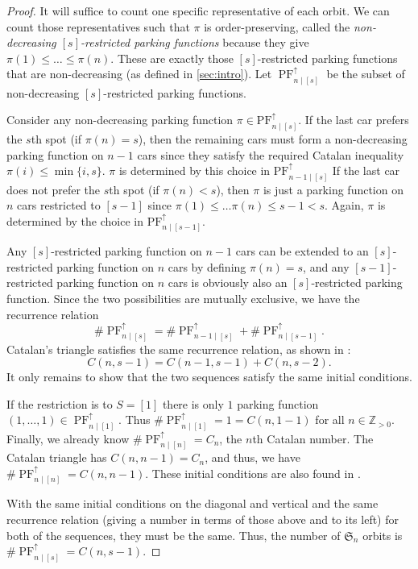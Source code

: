 \documentclass[12pt]{article}
\begin{document}
\begin{proof}
	It will suffice to count one specific representative of each orbit. We can count those representatives such that $\pi$ is order-preserving, called the \emph{non-decreasing $[s]$-restricted parking functions} because they give $\pi(1) \le \dots \le \pi(n)$. These are exactly those $[s]$-restricted parking functions that are non-decreasing (as defined in \cref{sec:intro}). Let $\operatorname{PF}_{n \mid [s]}^{\uparrow}$ be the subset of non-decreasing $[s]$-restricted parking functions.

	Consider any non-decreasing parking function $\pi \in \mathrm{PF}_{n \mid [s]}^{\uparrow}$. If the last car prefers the $s$th spot (if $\pi(n) = s$), then the remaining cars must form a non-decreasing parking function on $n - 1$ cars since they satisfy the required Catalan inequality $\pi(i) \le \min \{ i, s \}$. $\pi$ is determined by this choice in $\mathrm{PF}_{n - 1 \mid [s]}^{\uparrow}$ If the last car does not prefer the $s$th spot (if $\pi(n) < s$), then $\pi$ is just a parking function on $n$ cars restricted to $[s - 1]$ since $\pi(1) \le \dots \pi(n) \le s - 1 < s$. Again, $\pi$ is determined by the choice in $\mathrm{PF}_{n \mid [s - 1]}^{\uparrow}$.

	Any $[s]$-restricted parking function on $n - 1$ cars can be extended to an $[s]$-restricted parking function on $n$ cars by defining $\pi(n) = s$, and any $[s - 1]$-restricted parking function on $n$ cars is obviously also an $[s]$-restricted parking function. Since the two possibilities are mutually exclusive, we have the recurrence relation
	\[
		\# \operatorname{PF}_{n \mid [s]}^{\uparrow} = \# \operatorname{PF}_{n - 1 \mid [s]}^{\uparrow} + \# \operatorname{PF}_{n \mid [s - 1]}^{\uparrow} .
	\]
	Catalan's triangle satisfies the same recurrence relation, as shown in \cite{bailey-1996}:
	\[
		C(n, s - 1) = C(n - 1, s - 1) + C(n, s - 2).
	\]
	It only remains to show that the two sequences satisfy the same initial conditions.

	If the restriction is to $S = [1]$ there is only $1$ parking function $(1, \dots, 1) \in \operatorname{PF}_{n \mid [1]}^{\uparrow}$. Thus $\# \operatorname{PF}_{n \mid [1]}^{\uparrow} = 1 = C(n, 1 - 1)$ for all $n \in \mathbb{Z}_{> 0}$. Finally, we already know $\# \operatorname{PF}_{n \mid [n]}^{\uparrow}  = C_{n}$, the $n$th Catalan number. The Catalan triangle has $C(n, n - 1) = C_{n}$, and thus, we have $\# \operatorname{PF}_{n \mid [n]}^{\uparrow} = C(n, n - 1)$. These initial conditions are also found in \cite{bailey-1996}.

	With the same initial conditions on the diagonal and vertical and the same recurrence relation (giving a number in terms of those above and to its left) for both of the sequences, they must be the same. Thus, the number of $\mathfrak S_{n}$ orbits is $\# \operatorname{PF}_{n \mid [s]}^{\uparrow} = C(n, s - 1)$.
\end{proof}
\end{document}
